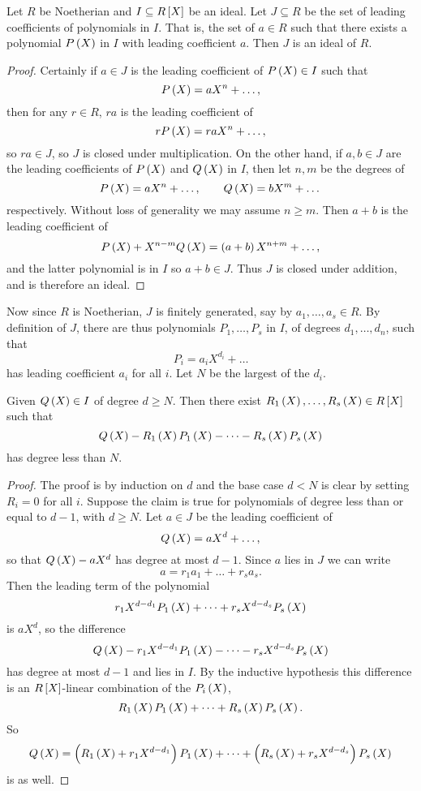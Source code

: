 \begin{lemma}
Let $ R $ be Noetherian and $ I \subseteq R\sbr{X} $ be an ideal. Let $ J \subseteq R $ be the set of leading coefficients of polynomials in $ I $. That is, the set of $ a \in R $ such that there exists a polynomial $ P\br{X} $ in $ I $ with leading coefficient $ a $. Then $ J $ is an ideal of $ R $.
\end{lemma}

\begin{proof}
Certainly if $ a \in J $ is the leading coefficient of $ P\br{X} \in I $ such that
$$ P\br{X} = aX^n + \dots, $$
then for any $ r \in R $, $ ra $ is the leading coefficient of
$$ rP\br{X} = raX^n + \dots, $$
so $ ra \in J $, so $ J $ is closed under multiplication. On the other hand, if $ a, b \in J $ are the leading coefficients of $ P\br{X} $ and $ Q\br{X} $ in $ I $, then let $ n, m $ be the degrees of
$$ P\br{X} = aX^n + \dots, \qquad Q\br{X} = bX^m + \dots $$
respectively. Without loss of generality we may assume $ n \ge m $. Then $ a + b $ is the leading coefficient of
$$ P\br{X} + X^{n - m}Q\br{X} = \br{a + b}X^{n + m} + \dots, $$
and the latter polynomial is in $ I $ so $ a + b \in J $. Thus $ J $ is closed under addition, and is therefore an ideal.
\end{proof}

\pagebreak

Now since $ R $ is Noetherian, $ J $ is finitely generated, say by $ a_1, \dots, a_s \in R $. By definition of $ J $, there are thus polynomials $ P_1, \dots, P_s $ in $ I $, of degrees $ d_1, \dots, d_n $, such that
$$ P_i = a_iX^{d_i} + \dots $$
has leading coefficient $ a_i $ for all $ i $. Let $ N $ be the largest of the $ d_i $.

\begin{lemma}
Given $ Q\br{X} \in I $ of degree $ d \ge N $. Then there exist $ R_1\br{X}, \dots, R_s\br{X} \in R\sbr{X} $ such that
$$ Q\br{X} - R_1\br{X}P_1\br{X} - \dots - R_s\br{X}P_s\br{X} $$
has degree less than $ N $.
\end{lemma}

\begin{proof}
The proof is by induction on $ d $ and the base case $ d < N $ is clear by setting $ R_i = 0 $ for all $ i $. Suppose the claim is true for polynomials of degree less than or equal to $ d - 1 $, with $ d \ge N $. Let $ a \in J $ be the leading coefficient of
$$ Q\br{X} = aX^d + \dots, $$
so that $ Q\br{X} - aX^d $ has degree at most $ d - 1 $. Since $ a $ lies in $ J $ we can write
$$ a = r_1a_1 + \dots + r_sa_s. $$
Then the leading term of the polynomial
$$ r_1X^{d - d_1}P_1\br{X} + \dots + r_sX^{d - d_s}P_s\br{X} $$
is $ aX^d $, so the difference
$$ Q\br{X} - r_1X^{d - d_1}P_1\br{X} - \dots - r_sX^{d - d_s}P_s\br{X} $$
has degree at most $ d - 1 $ and lies in $ I $. By the inductive hypothesis this difference is an $ R\sbr{X} $-linear combination of the $ P_i\br{X} $,
$$ R_1\br{X}P_1\br{X} + \dots + R_s\br{X}P_s\br{X}. $$
So
$$ Q\br{X} = \br{R_1\br{X} + r_1X^{d - d_1}}P_1\br{X} + \dots + \br{R_s\br{X} + r_sX^{d - d_s}}P_s\br{X} $$
is as well.
\end{proof}

